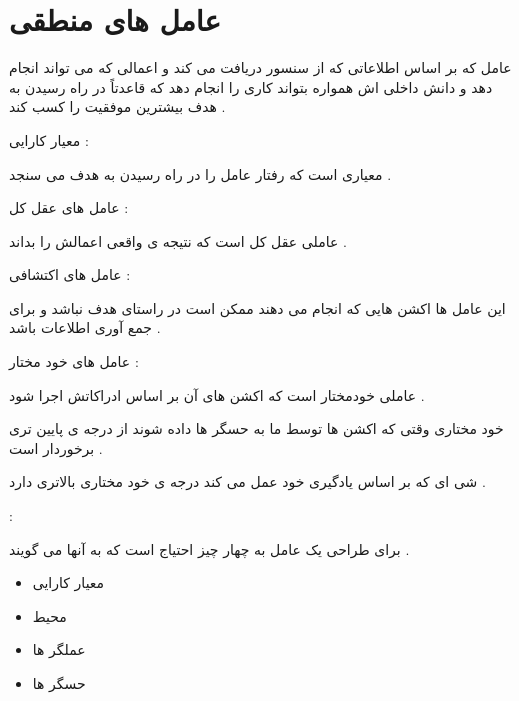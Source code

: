 \documentclass[12pt]{article}
\begin{document}
\section{عامل های منطقی}

\noindent
عامل که بر اساس اطلاعاتی که از سنسور دریافت می کند و اعمالی که می تواند انجام دهد و دانش داخلی اش همواره بتواند کاری را انجام دهد که قاعدتاً در راه رسیدن به هدف بیشترین موفقیت را کسب کند .


\vspace{10pt}


\noindent
معیار کارایی : 

\noindent
معیاری است که رفتار عامل را در راه رسیدن به هدف می سنجد .

\vspace{10pt}


\noindent
عامل های عقل کل : 

\noindent
عاملی عقل کل است که نتیجه ی واقعی اعمالش را بداند . 



\vspace{10pt}



\noindent
عامل های اکتشافی :

\noindent
این عامل ها اکشن هایی که انجام می دهند ممکن است در راستای هدف نباشد و برای جمع آوری اطلاعات باشد .


\vspace{10pt}


\noindent
عامل های خود مختار : 

\noindent
عاملی خودمختار است که اکشن های آن بر اساس ادراکاتش اجرا شود . 

\noindent
خود مختاری وقتی که اکشن ها توسط ما به حسگر ها داده شوند از درجه ی پایین تری برخوردار است .

\noindent
شی ای که بر اساس یادگیری خود عمل می کند درجه ی خود 
مختاری بالاتری دارد .


\vspace{30pt}


\noindent
{} :

\noindent
برای طراحی یک عامل به چهار چیز احتیاج است که به آنها 
می گویند .

\begin{itemize}
	\item معیار کارایی
	\item محیط
	\item عملگر ها 
	\item حسگر ها 
\end{itemize}
\end{document}
